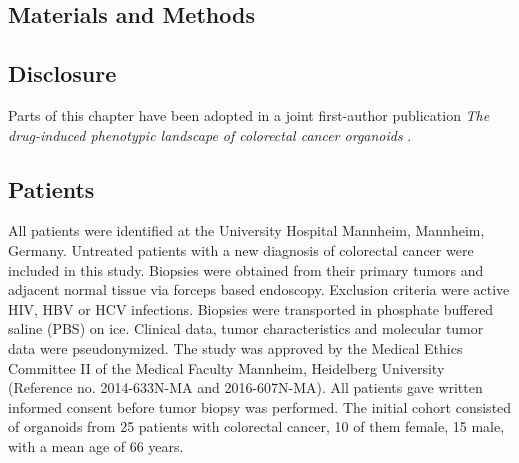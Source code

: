 \begin{flushleft}

\chapter{Materials and Methods}

\section{Disclosure}
Parts of this chapter have been adopted in a joint first-author publication \textit{The drug-induced phenotypic landscape of colorectal cancer organoids} \parencite{betgeDruginducedPhenotypicLandscape2022}.  

\section{Patients}
All patients were identified at the University Hospital Mannheim, Mannheim, Germany. Untreated patients with a new diagnosis of colorectal cancer were included in this study. Biopsies were obtained from their primary tumors and adjacent normal tissue via forceps based endoscopy. Exclusion criteria were active HIV, HBV or HCV infections. Biopsies were transported in phosphate buffered saline (PBS) on ice. Clinical data, tumor characteristics and molecular tumor data were pseudonymized. The study was approved by the Medical Ethics Committee II of the Medical Faculty Mannheim, Heidelberg University (Reference no. 2014-633N-MA and 2016-607N-MA). All patients gave written informed consent before tumor biopsy was performed. The initial cohort consisted of organoids from 25 patients with colorectal cancer, 10 of them female, 15 male, with a mean age of 66 years.


\end{flushleft}
